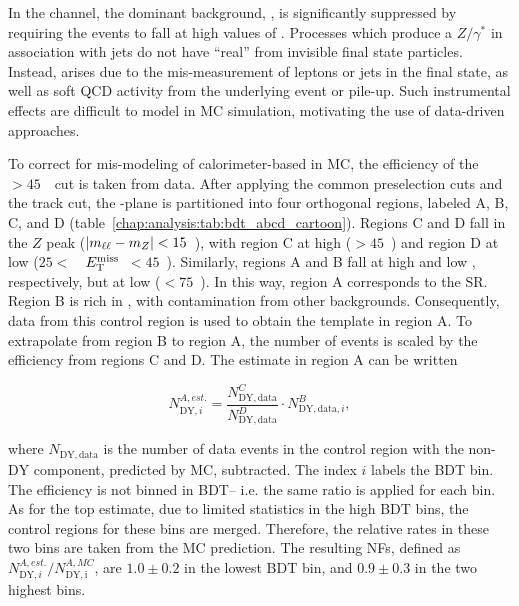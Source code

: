 
In the \eemm channel, the dominant background, \ZDY, is significantly
suppressed by requiring the events to fall at high values of
\etmiss. Processes which produce a $Z/\gamma^{*}$ in association with
jets do not have ``real'' \etmiss from invisible final state
particles. Instead, \etmiss arises due to the mis-measurement of
leptons or jets in the final state, as well as soft QCD activity from the underlying
event or pile-up. Such instrumental effects are difficult to model in
MC simulation, motivating the use of data-driven approaches. 

To correct for mis-modeling of calorimeter-based \etmiss in \ZDY MC, the
efficiency of the \calomet$>45$~\gev~cut is taken from data. After
applying the common preselection cuts and the track \etmiss cut, the
\mll-\etmiss plane is partitioned into four orthogonal regions, labeled A, B, C,
and D (table~\ref{chap:analysis:tab:bdt_abcd_cartoon}). Regions C and D fall in the $Z$ peak ($|m_{\ell\ell} -
m_Z| < 15$~\gev), with region C at high \etmiss ($>45$~\gev) and
region D at low \etmiss ($25 < $~\gev~$E_{\mathrm{T}}^{\rm miss}$~$ <
45$~\gev). Similarly, regions A and B fall at high and low \etmiss,
respectively, but at low \mll (\mll$< 75$~\gev). In this way, region A
corresponds to the \eemm SR. Region B is rich in \ZDY, with
 contamination from other backgrounds. Consequently,
data from this control region is used to obtain the \ZDY template in
region A. To extrapolate from region B to region A, the number of
events is scaled by the \etmiss efficiency from regions C and D. The
estimate in region A can be written

\begin{equation}
\label{chap:analysis:equation:dy_est1}
N_{\mathrm{DY},i}^{A,est.} = \frac{N_{\mathrm{DY},\mathrm{data}}^{C}}{N_{\mathrm{DY},\mathrm{data}}^{D}}\cdot{N_{\mathrm{DY},\mathrm{data},i}^{B}},
\end{equation}

\noindent
where $N_{\mathrm{DY},\mathrm{data}}$ is the number of data events in the control
region with the non-$\mathrm{DY}$ component, predicted by MC,
subtracted. The index $i$ labels the BDT bin. The \etmiss efficiency
is not binned in BDT-- i.e. the same ratio is applied for each bin. As
for the top estimate, due to limited statistics in the high BDT bins,
the control regions for these bins are merged. Therefore, the relative
rates in these two bins are taken from the MC prediction. The
resulting NFs, defined as
$N_{\mathrm{DY},i}^{A,est.}/N_{\mathrm{DY,i}}^{A,MC}$, are $1.0 \pm
0.2$ in the lowest BDT bin, and $0.9 \pm 0.3$ in the two highest bins.

